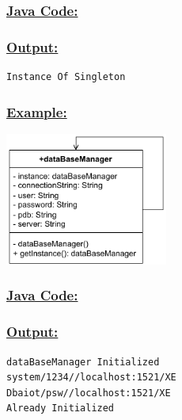\vspace{0.25cm}
\subsubsection*{\underline{Java Code:}}






\subsubsection*{\underline{Output:}}
\begin{lstlisting}[style=cmd]
Instance Of Singleton
\end{lstlisting}

\subsubsection*{\underline{Example:}}
\begin{center}
\includegraphics[width=0.4\textwidth,height=0.3\textheight]{Chapters/DesignPattern/Singleton/single2.drawio.pdf}
\end{center}


\subsubsection*{\underline{Java Code:}}





\newpage
\subsubsection*{\underline{Output:}}
\begin{lstlisting}[style=cmd]
dataBaseManager Initialized
system/1234//localhost:1521/XE
Dbaiot/psw//localhost:1521/XE
Already Initialized
\end{lstlisting}

